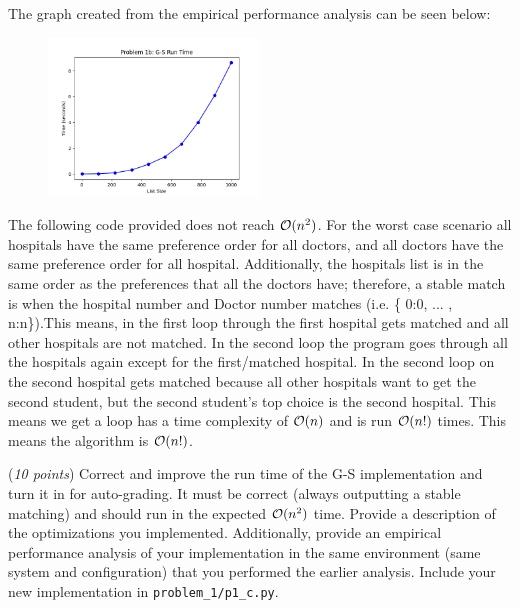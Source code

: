 \documentclass{hw}
\begin{document}
\begin{problem}
\begin{solution}
        The graph created from the empirical performance analysis can be seen below:
        \begin{figure}[h]
          \centering
              \includegraphics[width=0.5\textwidth]{figures/problem-1b.png}
        \end{figure}

        The following code provided does not reach $\mathcal{O}(n^2)$. For the worst case scenario all hospitals have the same preference order for all doctors, and all doctors have the same preference order for all hospital. Additionally, the hospitals list is in the same order as the preferences that all the doctors have; therefore, a stable match is when the hospital number and Doctor number matches (i.e. \{ 0:0, ... , n:n\}).This means, in the first loop through the first hospital gets matched and all other hospitals are not matched. In the second loop the program goes through all the hospitals again except for the first/matched hospital. In the second loop on the second hospital gets matched because all other hospitals want to get the second student, but the second student's top choice is the second hospital. This means we get a loop has a time complexity of $\mathcal{O}(n)$ and is run $\mathcal{O}(n!)$ times. This means the algorithm is $\mathcal{O}(n!)$.  
    \end{solution}

    \begin{subproblem}
    \newcommand{\worstrank}{{\tt wr}}
    (\textit{10 points})
    Correct and improve the run time of the G-S implementation and turn it in for
      auto-grading. It must be correct (always outputting a stable matching) and should run in the expected $\mathcal{O}(n^2)$ time. 
      Provide a description of the optimizations you implemented.
      Additionally, provide an empirical performance analysis of your
      implementation in the same environment (same system and configuration) that
      you performed the earlier analysis. Include your new implementation in \texttt{problem\_1/p1\_c.py}.
    \end{subproblem}


\end{problem}
\end{document}
